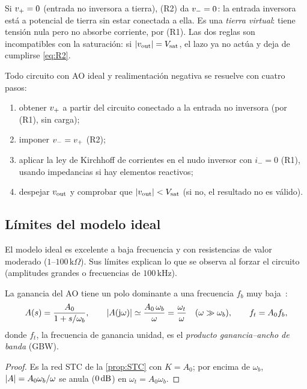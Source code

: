 \begin{observacion}\label{obs:tierra-virtual}
Si $v_{+}=0$ (entrada no inversora a tierra), (R2) da $v_{-}=0$: la entrada inversora está a potencial
de tierra sin estar conectada a ella. Es una \emph{tierra virtual}: tiene tensión nula pero no absorbe
corriente, por (R1). Las dos reglas son incompatibles con la saturación: si $\lvert v_{\mathrm{out}}\rvert=V_{\mathrm{sat}}$, el lazo
ya no actúa y deja de cumplirse \cref{eq:R2}.
\end{observacion}

\begin{proposicion}\label{prop:metodo}
Todo circuito con AO ideal y realimentación negativa se resuelve con cuatro pasos:
\begin{enumerate}
  \item obtener $v_{+}$ a partir del circuito conectado a la entrada no inversora (por (R1), sin carga);
  \item imponer $v_{-}=v_{+}$ (R2);
  \item aplicar la ley de Kirchhoff de corrientes en el nudo inversor con $i_{-}=0$ (R1), usando
        impedancias si hay elementos reactivos;
  \item despejar $v_{\mathrm{out}}$ y comprobar que $\lvert v_{\mathrm{out}}\rvert<V_{\mathrm{sat}}$ (si no, el resultado no es válido).
\end{enumerate}
\end{proposicion}

\subsection{Límites del modelo ideal}\label{sec:real}
El modelo ideal es excelente a baja frecuencia y con resistencias de valor moderado
($1$--$100\,\mathrm{k}\Omega$). Sus límites explican lo que se observa al forzar el circuito
(amplitudes grandes o frecuencias de $100\,\mathrm{kHz}$).

\begin{proposicion}\label{prop:Areal}
La ganancia del AO tiene un polo dominante a una frecuencia $f_b$ muy baja~\cite{TEORIA-EA}:
\begin{equation}\label{eq:Areal}
  A(s)=\frac{A_0}{1+s/\omega_b},\qquad
  \lvert A(\mathrm{j}\omega)\rvert\simeq\frac{A_0\,\omega_b}{\omega}=\frac{\omega_t}{\omega}\quad(\omega\gg\omega_b),\qquad
  f_t=A_0f_b ,
\end{equation}
donde $f_t$, la frecuencia de ganancia unidad, es el \emph{producto ganancia--ancho de banda} (GBW).
\end{proposicion}
\begin{proof}
Es la red STC de la \cref{prop:STC} con $K=A_0$; por encima de $\omega_b$, $\lvert A\rvert=A_0\omega_b/\omega$
se anula ($0\,\mathrm{dB}$) en $\omega_t=A_0\omega_b$.
\end{proof}

